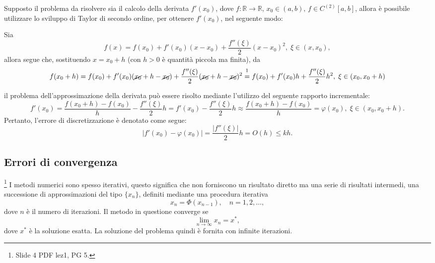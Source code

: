 Supposto il problema da risolvere sia il calcolo della derivata $f'(x_0)$, dove $f:\mathbb R\rightarrow\mathbb R,\, x_0\in (a,b),\, f\in C^{(2)}[a,b]$, allora è possibile utilizzare lo sviluppo di Taylor di secondo ordine, per ottenere $f'(x_0)$, nel seguente modo:

Sia
\begin{equation*}
	f(x)=f(x_0)+f'(x_0)(x-x_0)+\frac{f''(\xi)}{2}(x-x_0)^2,\; \xi\in(x,x_0),
\end{equation*}
allora segue che, sostituendo $x=x_0+h$ (con $h>0$ è quantità piccola ma finita), da
\begin{equation*}
	f(x_0+h)=f(x_0)+f'(x_0)(\cancel{x_0}+h-\cancel{x_0})+\frac{f''(\xi)}{2}(\cancel{x_0}+h-\cancel{x_0})^2\overset{\footnotemark}{=}f(x_0)+f'(x_0)h+\frac{f''(\xi)}{2}h^2,\; \xi\in(x_0,x_0+h)
\end{equation*}


\noindent il problema dell'approssimazione della derivata può essere risolto mediante l'utilizzo del seguente rapporto incrementale:
\begin{equation}\label{eq:approxF'ErrDiscr}
	f'(x_0)=\frac{f(x_0+h)-f(x_0)}{h}-\frac{f''(\xi)}{2}h=f'(x_0)-\frac{f''(\xi)}{2}h\approx\frac{f(x_0+h)-f(x_0)}{h}=\varphi(x_0),\; \xi\in(x_0,x_0+h).
\end{equation}
Pertanto, l'errore di discretizzazione è denotato come segue:
\begin{equation*}
	|f'(x_0)-\varphi(x_0)|=\frac{|f''(\xi)|}{2}h=O(h)\leq kh.
\end{equation*}

\subsection{Errori di convergenza}
\footnote{Slide 4 PDF lez1, PG 5.} I metodi numerici sono spesso iterativi, questo significa che non forniscono un risultato diretto ma una serie di risultati intermedi, una successione di approssimazioni del tipo $\{x_n\}$, definiti mediante una procedura iterativa
\begin{equation}\label{eq:approxProcIterat}
	x_n=\Phi(x_{n-1}),\quad n=1,2,\hdots,
\end{equation}
dove $n$ è il numero di iterazioni. Il metodo in questione converge se
\begin{equation}
	\lim_{n\rightarrow\infty}x_n=x^*,
\end{equation}
dove $x^*$ è la soluzione esatta. La soluzione del problema quindi è fornita con infinite iterazioni.

